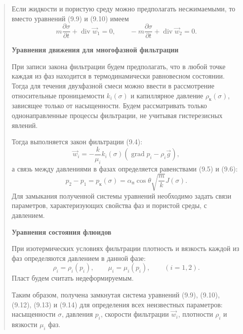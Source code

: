 \documentclass[12pt,a4paper]{article}
\DeclareMathOperator{\grad}{grad}
\DeclareMathOperator{\Div}{div}
\newcommand{\topic}[1]{\par\medskip\noindent\textbf{#1}\par\nobreak\smallskip}
\begin{document}
\begin{quote}\sloppy
Если жидкости и пористую среду можно предполагать несжимаемыми, то вместо уравнений (9.9) и (9.10) имеем
\begin{equation}m\frac{\partial\sigma}{\partial t}+\Div\vec w_1=0,\qquad-m\frac{\partial\sigma}{\partial t}+\Div\vec w_2=0.\tag{9.11}\label{q10:eq-9-11}\end{equation}
\topic{Уравнения движения для многофазной фильтрации}
При записи закона фильтрации будем предполагать, что в любой точке каждая из фаз находится в термодинамически равновесном состоянии. Тогда для течения двухфазной смеси можно ввести в рассмотрение относительные проницаемости $k_i(\sigma)$ и капиллярное давление $\rho_\text{к}(\sigma)$, зависящее только от насыщенности.
Будем рассматривать только однонаправленные процессы фильтрации, не учитывая гистерезисных явлений.

Тогда выполняется закон фильтрации (9.4):
\begin{equation}\vec w_i=-\frac{k}{\mu_i}k_i(\sigma)(\grad p_i-\rho_i\vec g),\tag{9.12}\label{q10:eq-9-12}\end{equation}
а связь между давлениями в фазах определяется равенствами (9.5) и (9.6):
\begin{equation}p_2-p_1=p_\text{к}(\sigma)=\alpha_\text{п}\cos\theta\sqrt{\frac{m}{k}}J(\sigma).\tag{9.13}\label{q10:eq-9-13}\end{equation}
Для замыкания полученной системы уравнений необходимо задать связи параметров, характеризующих свойства фаз и пористой среды, с давлением.

\topic{Уравнения состояния флюидов}
При изотермических условиях фильтрации плотность и вязкость каждой из фаз определяются давлением в данной фазе:
\begin{equation}\rho_i=\rho_i(p_i),\qquad\mu_i=\mu_i(p_i),\qquad(i=1,2).\tag{9.14}\label{q10:eq-9-14}\end{equation}
Пласт будем считать недеформируемым.

Таким образом, получена замкнутая система уравнений (9.9), (9.10), (9.12), (9.13) и (9.14) для определения всех неизвестных параметров: насыщенности $\sigma$, давления $p_i$, скорости фильтрации $\vec w_i$, плотности $\rho_i$ и вязкости $\mu_i$ фаз.
\par\nobreak{}\par
\end{quote}
\end{document}
